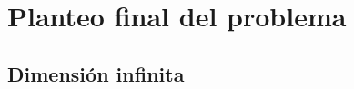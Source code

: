 \documentclass[a4paper,10pt]{book}
\newcommand{\bx}{\bar{x}}
\newcommand{\bmu}{\bar{\mu}}
\newcommand{\cI}{\mathpzc{I}}
\newcommand{\cA}{\mathpzc{A}}
\begin{document}







\chapter{Planteo final del problema}

\section{Dimensión infinita}
\end{document}
